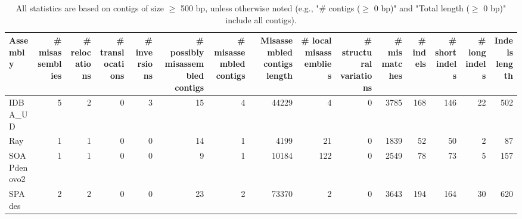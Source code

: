 \documentclass[12pt,a4paper]{article}
\begin{document}
\begin{table}[ht]
\begin{center}
\caption{All statistics are based on contigs of size $\geq$ 500 bp, unless otherwise noted (e.g., "\# contigs ($\geq$ 0 bp)" and "Total length ($\geq$ 0 bp)" include all contigs).}
\begin{tabular}{|l*{14}{|r}|}
\hline
Assembly & \# misassemblies &     \# relocations &     \# translocations &     \# inversions & \# possibly misassembled contigs & \# misassembled contigs & Misassembled contigs length & \# local misassemblies & \# structural variations & \# mismatches & \# indels &     \# short indels &     \# long indels & Indels length \\ \hline
IDBA\_UD & 5 & 2 & 0 & 3 & 15 & 4 & 44229 & 4 & 0 & 3785 & 168 & 146 & 22 & 502 \\ \hline
Ray & 1 & 1 & 0 & 0 & 14 & 1 & 4199 & 21 & 0 & 1839 & 52 & 50 & 2 & 87 \\ \hline
SOAPdenovo2 & 1 & 1 & 0 & 0 & 9 & 1 & 10184 & 122 & 0 & 2549 & 78 & 73 & 5 & 157 \\ \hline
SPAdes & 2 & 2 & 0 & 0 & 23 & 2 & 73370 & 2 & 0 & 3643 & 194 & 164 & 30 & 620 \\ \hline
\end{tabular}
\end{center}
\end{table}
\end{document}
